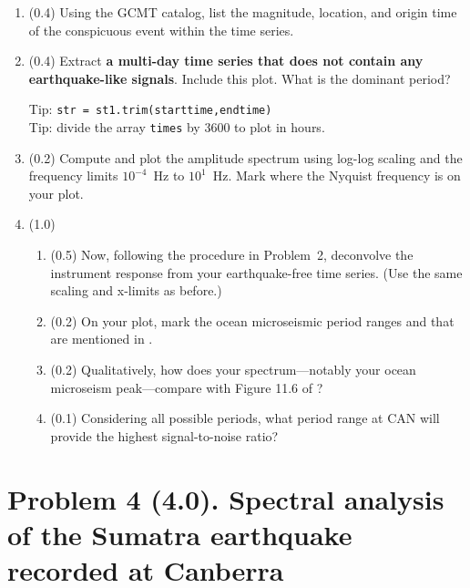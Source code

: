 \documentclass[11pt,titlepage,fleqn]{article}
\begin{document}
\begin{enumerate}
\item (0.4) Using the GCMT catalog, list the magnitude, location, and origin time of the conspicuous event within the time series. 

\item (0.4) Extract {\bf a multi-day time series that does not contain any earthquake-like signals}. Include this plot. What is the dominant period?

Tip: \verb+str = st1.trim(starttime,endtime)+ \\
Tip: divide the array \verb+times+ by 3600 to plot in hours.

\item (0.2) Compute and plot the amplitude spectrum using log-log scaling and the frequency limits $10^{-4}$~Hz to $10^1$~Hz. Mark where the Nyquist frequency is on your plot.

\item (1.0)

\begin{enumerate}
\item (0.5) Now, following the procedure in Problem~2, deconvolve the instrument response from your earthquake-free time series. (Use the same scaling and x-limits as before.)

%
%

\item (0.2) On your plot, mark the ocean microseismic period ranges  and  that are mentioned in \citet[][Section 11.2]{ShearerE2}.

\item (0.2) Qualitatively, how does your spectrum---notably your ocean microseism peak---compare with Figure 11.6 of \citet{ShearerE2}?

\item (0.1) Considering all possible periods, what period range at CAN will provide the highest signal-to-noise ratio?

\end{enumerate}

\end{enumerate}


\pagebreak
\section*{Problem 4 (4.0). Spectral analysis of the Sumatra earthquake recorded at Canberra}
\end{document}
